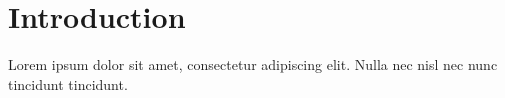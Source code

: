 \chapter{Introduction}\label{ch:introduction}
Lorem ipsum dolor sit amet, consectetur adipiscing elit.
Nulla nec nisl nec nunc tincidunt tincidunt. 
